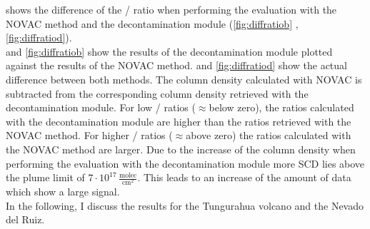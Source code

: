 \documentclass  [
  paper    = a4,
  BCOR     = 10mm,
  twoside,
  fontsize = 12pt,
  fleqn,
  toc      = bibnumbered,
  toc      = listofnumbered,
  numbers  = noendperiod,
  headings = normal,
  listof   = leveldown,
  version  = 3.03
]                                       {scrreprt}
\begin{document}
 shows the difference of the / ratio when performing the evaluation with the NOVAC method and the decontamination module (\cref{fig:diffratiob} , \ref{fig:diffratiod}).\\  and \ref{fig:diffratiob} show the results of the decontamination module plotted against the results of the NOVAC method.   and \ref{fig:diffratiod} show the actual difference between both methods. The column density calculated with NOVAC is subtracted from the corresponding column density retrieved with the decontamination module.  For low /  ratios ($\approx$below zero), the ratios calculated with the decontamination module are higher than the ratios retrieved with the NOVAC method. For higher /  ratios ($\approx$above zero) the ratios calculated with the NOVAC method are larger. 
Due to the increase of the   column density when performing the evaluation with the decontamination module more   SCD lies above the plume limit of $7\cdot10^{17}\,\frac{\text{molec}}{\text{cm}^2}$. This leads to an increase of the amount of data which show a large  signal.\\ 
%
In the following, I discuss the results for the Tungurahua volcano and the Nevado del Ruiz. 
%
\end{document}
